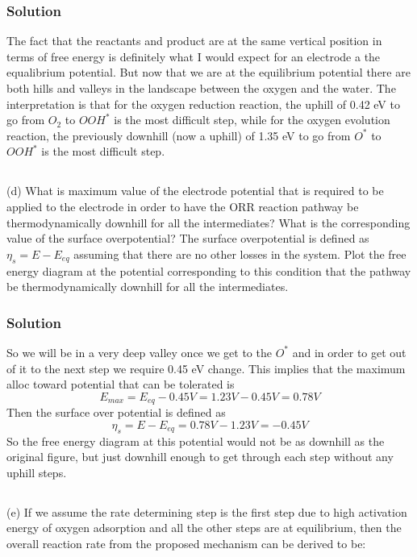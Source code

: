 \documentclass[12pt]{article}
\begin{document}
\subsubsection{Solution}
The fact that the reactants and product are at the same vertical position in terms of free energy is definitely what I would expect for an electrode a the equalibrium potential. But now that we are at the equilibrium potential there are both hills and valleys in the landscape between the oxygen and the water. The interpretation is that for the oxygen reduction reaction, the uphill of 0.42 eV to go from $O_2$ to $OOH^*$ is the most difficult step, while for the oxygen evolution reaction, the previously downhill (now a uphill) of 1.35 eV to go from $O^*$ to $OOH^*$ is the most difficult step.
\subsection{}
(d) What is maximum value of the electrode potential that is required to be applied to the electrode in order to have the ORR reaction pathway be thermodynamically downhill for all the intermediates? What is the corresponding value of the surface overpotential? The surface overpotential is defined as $\eta_{s}=E-E_{e q}$ assuming that there are no other losses in the system. Plot the free energy diagram at the potential corresponding to this condition that the pathway be thermodynamically downhill for all the intermediates.\\
\subsubsection{Solution}
So we will be in a very deep valley once we get to the $O^*$ and in order to get out of it to the next step we require 0.45 eV change. This implies that the maximum alloc toward potential that can be tolerated is
\begin{equation}
E_{max} = E_{eq} - 0.45 V = 1.23 V - 0.45 V = 0.78 V
\end{equation}
Then the surface over potential is defined as
\begin{equation}
\eta_{s} = E - E_{eq} = 0.78 V - 1.23 V = -0.45 V
\end{equation}
So the free energy diagram at this potential would not be as downhill as the original figure, but just downhill enough to get through each step without any uphill steps.
\subsection{}
(e) If we assume the rate determining step is the first step due to high activation energy of oxygen adsorption and all the other steps are at equilibrium, then the overall reaction rate from the proposed mechanism can be derived to be:
\end{document}
